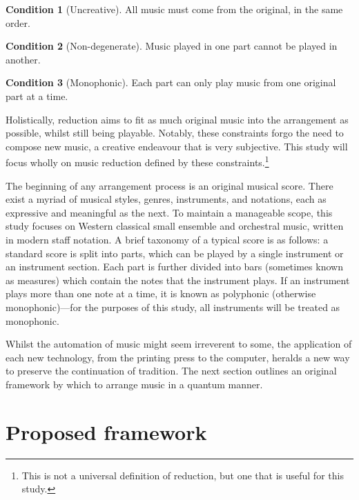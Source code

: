 \documentclass[12pt]{article}
\theoremstyle{definition}
\newtheorem{condition}{Condition}
\begin{document}
\begin{condition}[Uncreative]
    All music must come from the original, in the same order.
    \label{con:uncreative}
\end{condition}
\begin{condition}[Non-degenerate]
    Music played in one part cannot be played in another.
    \label{con:non-degenerate}
\end{condition}
\begin{condition}[Monophonic]
    Each part can only play music from one original part at a time.
    \label{con:monophonic}
\end{condition}

Holistically, reduction aims to fit as much original music into the arrangement as possible, whilst still being playable. Notably, these constraints forgo the need to compose new music, a creative endeavour that is very subjective. This study will focus wholly on music reduction defined by these constraints.\footnote{This is not a universal definition of reduction, but one that is useful for this study.}

The beginning of any arrangement process is an original musical score. There exist a myriad of musical styles, genres, instruments, and notations, each as expressive and meaningful as the next. To maintain a manageable scope, this study focuses on Western classical small ensemble and orchestral music, written in modern staff notation. A brief taxonomy of a typical score is as follows: a standard score is split into parts, which can be played by a single instrument or an instrument section. Each part is further divided into bars (sometimes known as measures) which contain the notes that the instrument plays. If an instrument plays more than one note at a time, it is known as polyphonic (otherwise monophonic)---for the purposes of this study, all instruments will be treated as monophonic.

Whilst the automation of music might seem irreverent to some, the application of each new technology, from the printing press to the computer, heralds a new way to preserve the continuation of tradition. The next section outlines an original framework by which to arrange music in a quantum manner.

\section{Proposed framework}
\end{document}
